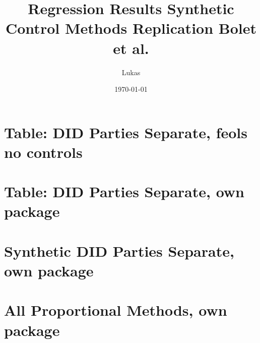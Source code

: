 \documentclass{article}
\begin{document}
	
	\title{Regression Results Synthetic Control Methods Replication Bolet et al.}
	\author{Lukas}
	\date{\today}
	\maketitle
	
	
	\section{Table: DID Parties Separate, feols no controls}
	

	
	\section{Table: DID Parties Separate, own package}
	

	\section{Synthetic DID Parties Separate, own package}
	

	\section{All Proportional Methods, own package}
	
	
	
	
\end{document}
